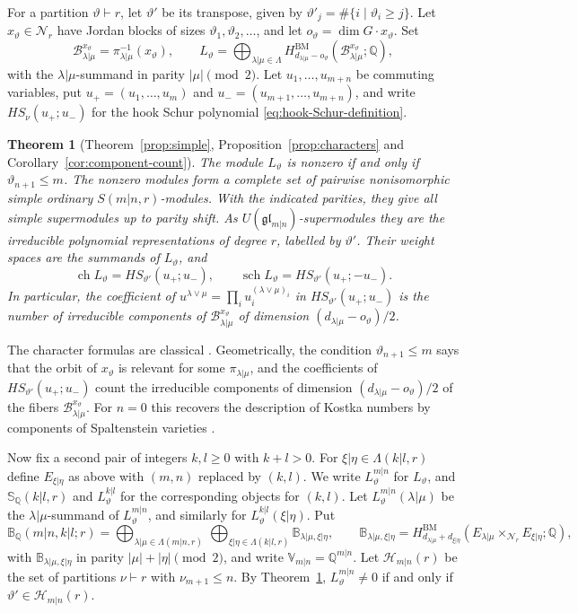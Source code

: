 \documentclass[11pt,a4paper]{amsart}
\newtheorem{introthm}{Theorem}
\theoremstyle{definition}
\theoremstyle{remark}
\newcommand{\Q}{\mathbb Q}
\newcommand{\N}{\mathcal N}
\newcommand{\bS}{\mathbb S}
\newcommand{\bB}{\mathbb B}
\newcommand{\BM}{\mathrm{BM}}
\newcommand{\lm}{\lambda|\mu}
\newcommand{\xh}{\xi|\eta}
\numberwithin{equation}{section}
\begin{document}
For a partition $\vartheta\vdash r$, let $\vartheta'$ be its transpose,
given by $\vartheta'_j=\#\{i\mid\vartheta_i\geq j\}$. Let $x_\vartheta\in\N_r$
have Jordan blocks of sizes $\vartheta_1,\vartheta_2,\ldots$, and let
$o_\vartheta=\dim G\cdot x_\vartheta$. Set
$$
\mathcal B_{\lm}^{x_\vartheta}=\pi_{\lm}^{-1}(x_\vartheta),\qquad
L_\vartheta
=\bigoplus_{\lm\in\Lambda}
H^{\BM}_{d_{\lm}-o_\vartheta}
  (\mathcal B_{\lm}^{x_\vartheta};\Q),
$$
with the $\lm$-summand in parity $|\mu|\pmod2$. Let
$u_1,\ldots,u_{m+n}$ be commuting variables, put $u_+=(u_1,\ldots,u_m)$
and $u_-=(u_{m+1},\ldots,u_{m+n})$, and write $HS_\nu(u_+;u_-)$ for the
hook Schur polynomial \eqref{eq:hook-Schur-definition}.

\begin{introthm}[Theorem~\ref{prop:simple}, Proposition~\ref{prop:characters} and Corollary~\ref{cor:component-count}]\label{thm:intro-representations}
The module $L_\vartheta$ is nonzero if and only if
$\vartheta_{n+1}\leq m$. The nonzero modules form a complete set of
pairwise nonisomorphic simple ordinary $S(m|n,r)$-modules. With the
indicated parities, they give all simple supermodules up to parity
shift. As $U(\mathfrak{gl}_{m|n})$-supermodules they are the irreducible
polynomial representations of degree $r$, labelled by $\vartheta'$. Their weight spaces are the summands
of $L_\vartheta$, and
$$
\operatorname{ch}L_\vartheta=HS_{\vartheta'}(u_+;u_-),\qquad
\operatorname{sch}L_\vartheta=HS_{\vartheta'}(u_+;-u_-).
$$
In particular, the coefficient of
$u^{\lambda\vee\mu}=\prod_{i}u_i^{(\lambda\vee\mu)_i}$ in
$HS_{\vartheta'}(u_+;u_-)$ is the number of irreducible components of
$\mathcal B_{\lm}^{x_\vartheta}$ of dimension $(d_{\lm}-o_\vartheta)/2$.
\end{introthm}

The character formulas are classical \cite{Ser,BR}. Geometrically, the
condition $\vartheta_{n+1}\le m$ says that the orbit of $x_\vartheta$ is relevant for some $\pi_{\lm}$, and
the coefficients of $HS_{\vartheta'}(u_+;u_-)$ count the irreducible
components of dimension $(d_{\lm}-o_\vartheta)/2$ of the fibers
$\mathcal B^{x_\vartheta}_{\lm}$. For $n=0$ this recovers the description
of Kostka numbers by components of Spaltenstein varieties
\cite[Section~3.5]{BM}.

Now fix a second pair of integers $k,l\geq0$ with $k+l>0$. For
$\xh\in\Lambda(k|l,r)$ define $E_{\xh}$ as above with $(m,n)$ replaced by
$(k,l)$. We write $L^{m|n}_\vartheta$ for $L_\vartheta$, and
$\bS_\Q(k|l,r)$ and $L^{k|l}_\vartheta$ for the corresponding objects
for $(k,l)$. Let $L^{m|n}_\vartheta(\lm)$ be the
$\lm$-summand of $L^{m|n}_\vartheta$, and similarly for
$L^{k|l}_\vartheta(\xh)$. Put
$$
\bB_\Q(m|n,k|l;r)=\bigoplus_{\lm\in\Lambda(m|n,r)}\,\bigoplus_{\xh\in\Lambda(k|l,r)}
\bB_{\lm,\xh},\qquad
\bB_{\lm,\xh}=H^{\BM}_{d_{\lm}+d_{\xh}}(E_{\lm}\times_{\N_r}E_{\xh};\Q),
$$
with $\bB_{\lm,\xh}$ in parity $|\mu|+|\eta|\pmod2$, and write
$\mathbb V_{m|n}=\Q^{m|n}$. Let $\mathcal H_{m|n}(r)$ be the set of
partitions $\nu\vdash r$ with $\nu_{m+1}\leq n$. By
Theorem~\ref{thm:intro-representations}, $L^{m|n}_\vartheta\neq0$ if and
only if $\vartheta'\in\mathcal H_{m|n}(r)$.
\end{document}
